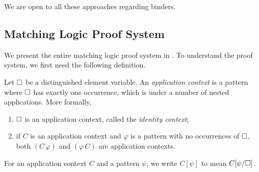 \documentclass{article}
\begin{document}
We are open to all these approaches regarding binders. 

\subsection{Matching Logic Proof System}
\label{sec:ml_proof_system}

We present the entire matching logic proof system in 
.
To understand the proof system, we first need the following definition.

\begin{definition}
Let $\square$ be a distinguished element variable.
An \emph{application context} is a pattern
where $\square$ has exactly one occurrence, which is under 
a number of nested applications. 
More formally, 
\begin{enumerate}
\item $\square$ is an application context, called the \emph{identity context};
\item if $C$ is an application context and $\varphi$ is a pattern
      with no occurrences of $\square$,
      both $(C \, \varphi)$ and $(\varphi \, C)$ are application contexts. 
\end{enumerate}
For an application context $C$ and a pattern $\psi$,
we write $C[\psi]$ to mean $C[\psi/\square]$. 
\end{definition}
\end{document}

